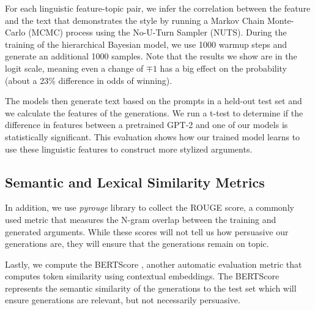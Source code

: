 For each linguistic feature-topic pair, we infer the correlation between the feature and the text that demonstrates the style by running a Markov Chain Monte-Carlo (MCMC) process using the No-U-Turn Sampler (NUTS). During the training of the hierarchical Bayesian model, we use 1000 warmup steps and generate an additional 1000 samples. Note that the results we show are in the logit scale, meaning even a change of $\mp 1$ has a big effect on the probability (about a 23\% difference in odds of winning).  

The models then generate text based on the prompts in a held-out test set and we calculate the features of the generations. We run a t-test to determine if the difference in features between a pretrained GPT-2 and one of our models is statistically significant. This evaluation shows how our trained model learns to use these linguistic features to construct more stylized arguments.

\subsection{Semantic and Lexical Similarity Metrics}
\label{subsec:si_similarity}

In addition, we use \textit{pyrouge} library to collect the ROUGE \citep{lin-2004-rouge} score, a commonly used metric that measures the N-gram overlap between the training and generated arguments. While these scores will not tell us how persuasive our generations are, they will ensure that the generations remain on topic.

Lastly, we compute the BERTScore \citep{zhang2019bertscore}, another automatic evaluation metric that computes token similarity using contextual embeddings. The BERTScore represents the semantic similarity of the generations to the test set which will ensure generations are relevant, but not necessarily persuasive.